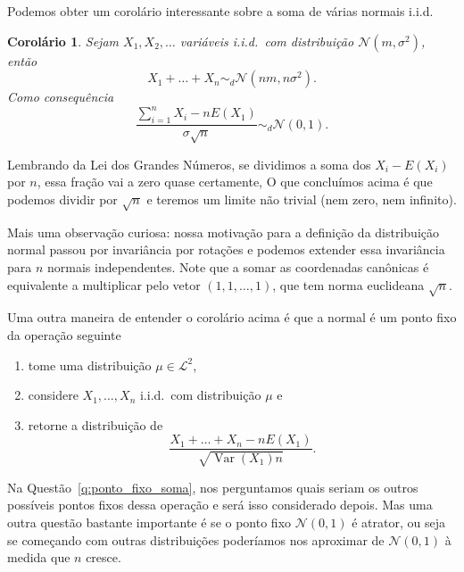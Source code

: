 \documentclass[reqno, final]{book}
\newcommand*\1{\mathds{1}}
\newtheorem{corollary}[theorem]{Corolário}
\DeclareMathOperator{\Var}{Var}
\def \iid{i.i.d.~}
\def \distr{\sim_d}
\begin{document}

Podemos obter um corolário interessante sobre a soma de várias normais i.i.d.
\begin{corollary}
  \label{c:normaliz_normais}
  Sejam $X_1, X_2, \dots$ variáveis \iid com distribuição $\mathcal{N}(m,\sigma^2)$, então
  \begin{equation}
    X_1 + \dots + X_n \distr \mathcal{N}(nm, n \sigma^2).
  \end{equation}
  Como consequência
  \begin{equation}
    \frac{\sum_{i=1}^n X_i - n E(X_1)}{\sigma \sqrt{n}} \distr \mathcal{N}(0,1).
  \end{equation}
\end{corollary}

Lembrando da Lei dos Grandes Números, se dividimos a soma dos $X_i - E(X_i)$ por $n$, essa fração vai a zero quase certamente,
O que concluímos acima é que podemos dividir por $\sqrt{n}$ e teremos um limite não trivial (nem zero, nem infinito).

Mais uma observação curiosa: nossa motivação para a definição da distribuição normal passou por invariância por rotações e podemos extender essa invariância para $n$ normais independentes.
Note que a somar as coordenadas canônicas é equivalente a multiplicar pelo vetor $(1,1,\dots,1)$, que tem norma euclideana $\sqrt{n}$.

Uma outra maneira de entender o corolário acima é que a normal é um ponto fixo da operação seguinte
\begin{enumerate}[\quad a)]
\item tome uma distribuição $\mu \in \mathcal{L}^2$,
\item considere $X_1, \dots, X_n$ \iid com distribuição $\mu$ e
\item retorne a distribuição de
  \begin{equation}
    \frac{X_1 + \dots + X_n - n E(X_1)}{\sqrt{\Var(X_1) n}}.
  \end{equation}
\end{enumerate}

Na Questão~\ref{q:ponto_fixo_soma}, nos perguntamos quais seriam os outros possíveis pontos fixos dessa operação e será isso considerado depois.
Mas uma outra questão bastante importante é se o ponto fixo $\mathcal{N}(0,1)$ é atrator, ou seja se começando com outras distribuições poderíamos nos aproximar de $\mathcal{N}(0,1)$ à medida que $n$ cresce.
\end{document}
